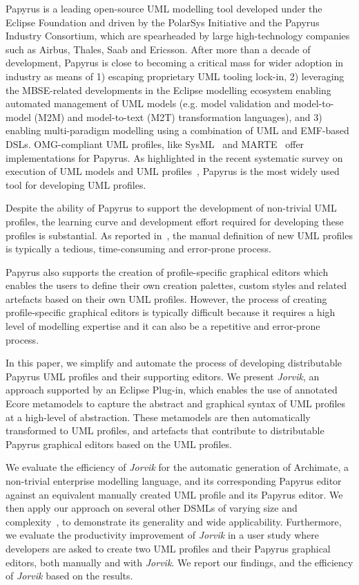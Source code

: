 Papyrus \cite{lanusse2009papyrus} is a leading open-source UML modelling tool developed under the Eclipse Foundation and driven by the PolarSys Initiative and the Papyrus Industry Consortium, which are spearheaded by large high-technology companies such as Airbus, Thales, Saab and Ericsson. 
After more than a decade of development, Papyrus is close to becoming a critical mass for wider adoption in industry as means of 1) escaping proprietary UML tooling lock-in, 2) leveraging the MBSE-related developments in the Eclipse modelling ecosystem enabling automated management of UML models (e.g. model validation and model-to-model (M2M) and model-to-text (M2T) transformation languages), and 3) enabling multi-paradigm modelling using a combination of UML and EMF-based DSLs. 
OMG-compliant UML profiles, like SysML~\cite{friedenthal2014practical} and MARTE~\cite{omg2011marte} offer implementations for Papyrus. 
As highlighted in the recent systematic survey on execution of UML models and UML profiles~\cite{ciccozzi2018execution}, Papyrus is the most widely used tool for developing UML profiles. 

Despite the ability of Papyrus to support the development of non-trivial UML profiles, the learning curve and development effort required for developing these profiles is substantial.
As reported in~\cite{Wimmer2009:IJWIS}, the manual definition of new UML profiles is typically a tedious, time-consuming and error-prone process.

Papyrus also supports the creation of profile-specific graphical editors which enables the users to define their own creation palettes, custom styles and related artefacts based on their own UML profiles. 
However, the process of creating profile-specific graphical editors is typically difficult because it requires a high level of modelling expertise and it can also be a repetitive and error-prone process.

In this paper, we simplify and automate the process of developing distributable Papyrus UML profiles and their supporting editors. 
We present \textit{Jorvik}, an approach supported by an Eclipse Plug-in, which enables the use of annotated Ecore metamodels to capture the abstract and graphical syntax of UML profiles at a high-level of abstraction. These metamodels are then automatically transformed to UML profiles, and artefacts that contribute to distributable Papyrus graphical editors based on the UML profiles. 


We evaluate the efficiency of \textit{Jorvik} for the automatic generation of Archimate, a non-trivial enterprise modelling language, and its corresponding Papyrus editor against an equivalent manually created UML profile and its Papyrus editor. 
We then apply our approach on several other DSMLs of varying size and complexity~\cite{williams2013metamodels}, to demonstrate its generality and wide applicability. 
Furthermore, we evaluate the productivity improvement of \textit{Jorvik} in a user study where developers are asked to create two UML profiles and their Papyrus graphical editors, both manually and with \textit{Jorvik}.
We report our findings, and the efficiency of \textit{Jorvik} based on the results. 

